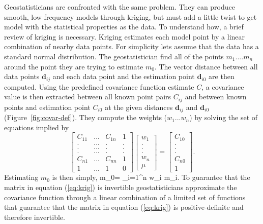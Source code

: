 \par
Geostatisticians are confronted with the same problem. They can produce
smooth, low frequency models through kriging, but must add a little
twist to get model with the statistical properties as the data.
To understand how, a brief review of kriging is necessary.
Kriging estimates each model point by a linear combination of nearby data 
points. For simplicity lets assume that the data has a standard
normal distribution.
The geostatistician find all of the points $m_1 .... m_n$ around the point they
are trying to estimate $m_0$. The vector distance between all data points
$\mathbf{d}_{ij}$
and each data point and the estimation point $\mathbf{d}_{i0}$ are then computed.
Using the predefined covariance function estimate $C$, a covariance
value is then extracted
between all known point pairs $C_{ij}$ and
between known points and
estimation point $C_{i0}$ at the given distances $\mathbf{d}_{ij}$  and
$\mathbf{d}_{i0}$   (Figure~\ref{fig:covar-def}).
They compute the weights   ($w_1 ... w_n$) by solving the set
of equations implied by
\begin{equation}
\left[
\begin{array}{cccc}
C_{11}  &...& C_{1n} & 1 \\
.  &...& . & . \\
.  &...& . & . \\
.  &...& . & . \\
C_{n1}  &...& C_{nn} &  1 \\
1 &...& 1 & 0
\end{array}
\right]
\left[
\begin{array}{c}
w_1 \\
. \\
. \\
. \\
w_n \\
\mu
\end{array}
\right]
=
\left[
\begin{array}{c}
C_{10} \\
. \\
. \\
. \\
C_{n0} \\
1
\end{array} \label{eq:krig}
\right] .
\end{equation}
Estimating $m_0$ is then simply,
\beq
m_0= \sum_{i=1}^{n} w_i m_i.
\eeq
To guarantee that the matrix in equation (\ref{eq:krig})
is invertible geostatisticians approximate
the covariance function
through a linear combination of a limited set of
functions that guarantee that the matrix in equation (\ref{eq:krig}) is
positive-definite and therefore invertible.

